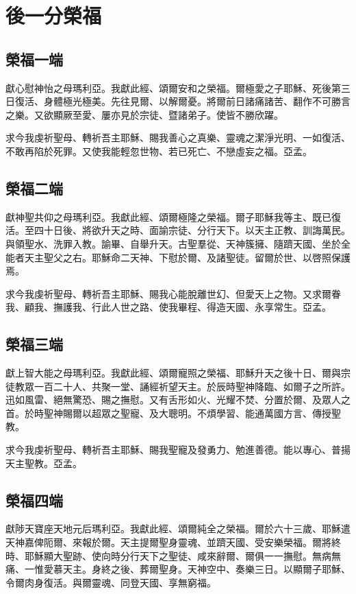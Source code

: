 \section*{後一分榮福}
\subsection{榮福一端}
獻{\cspace}心慰神怡之母瑪利亞。我獻此經、頌爾安和之榮福。爾極愛之子耶穌、死後第三日復活、身體極光極美。先往見爾、以解爾憂。將爾前日諸痛諸苦、翻作不可勝言之樂。又欲顯厥至愛、屢亦見於宗徒、暨諸弟子。使皆不勝欣躍。

求{\cspace}今我虔祈聖母、轉祈吾主耶穌、賜我善心之真樂、靈魂之潔淨光明、一如復活、不敢再陷於死罪。又使我能輕忽世物、若已死亡、不戀虛妄之福。{\cspace}亞孟。

\subsection{榮福二端}
獻{\cspace}神聖共仰之母瑪利亞。我獻此經、頌爾極隆之榮福。爾子耶穌我等主、既已復活。至四十日後、將欲升天之時、面諭宗徒、分行天下。以天主正教、訓誨萬民。與領聖水、洗罪入教。諭畢、自舉升天。古聖羣從、天神簇擁、隨躋天國、坐於全能者天主聖父之右。耶穌命二天神、下慰於爾、及諸聖徒。留爾於世、以啓照保護焉。

求{\cspace}今我虔祈聖母、轉祈吾主耶穌、賜我心能脫離世幻、但愛天上之物。又求爾眷我、顧我、撫護我、行此人世之路、使我畢程、得造天國、永享常生。{\cspace}亞孟。

\subsection{榮福三端}
獻{\cspace}上智大能之母瑪利亞。我獻此經、頌爾寵照之榮福、耶穌升天之後十日、爾與宗徒教眾一百二十人、共聚一堂、誦經祈望天主。於辰時聖神降臨、如爾子之所許。迅如風雷、絕無驚恐、賜之撫慰。又有舌形如火、光耀不焚、分置於爾、及眾人之首。於時聖神賜爾以超眾之聖寵、及大聰明。不煩學習、能通萬國方言、傳授聖教。

求{\cspace}今我虔祈聖母、轉祈吾主耶穌、賜我聖寵及發勇力、勉進善德。能以專心、普揚天主聖教。{\cspace}亞孟。

\subsection{榮福四端}
獻{\cspace}陟天寶座天地元后瑪利亞。我獻此經、頌爾純全之榮福。爾於六十三歲、耶穌遣天神嘉俾阨爾、來報於爾。天主提爾聖身靈魂、並躋天國、受安樂榮福。爾將終時、耶穌顯大聖跡、使向時分行天下之聖徒、咸來辭爾、爾俱一一撫慰。無病無痛、一惟愛慕天主。身終之後、葬爾聖身。天神空中、奏樂三日。以顯爾子耶穌、令爾肉身復活。與爾靈魂、同登天國、享無窮福。

